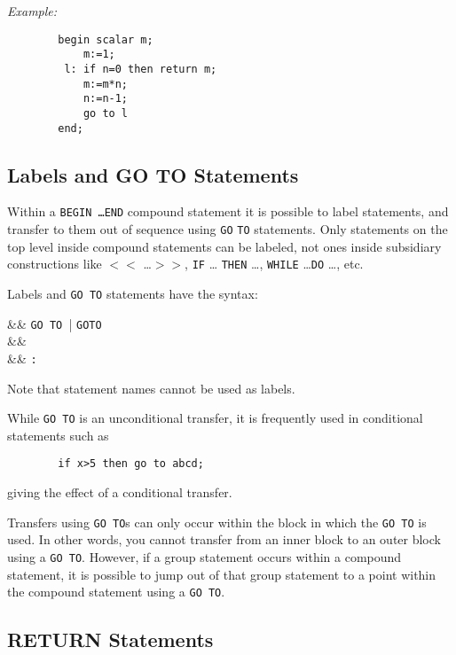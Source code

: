 \textit{Example:}
\begin{verbatim}
        begin scalar m;
            m:=1;
         l: if n=0 then return m;
            m:=m*n;
            n:=n-1;
            go to l
        end;
\end{verbatim}

\subsection{Labels and GO TO Statements}
\hypertarget{command:GOTO}{}

Within a \texttt{BEGIN \ldots END} compound
statement it is possible to label statements, and transfer to them out of
sequence using \texttt{GO} \texttt{TO} statements.  Only statements on the top
level inside compound statements can be labeled, not ones inside
subsidiary constructions like \texttt{$<<$} \ldots \texttt{$>>$}, \texttt{IF} \ldots
\texttt{THEN} \ldots , \texttt{WHILE} \ldots \texttt{DO} \ldots , etc.

Labels and \texttt{GO TO} statements have the syntax:
\begin{syntaxtable}
   &\BNFprod& \texttt{GO TO }|%
                                    \texttt{GOTO } \\
   &\BNFprod& \\
   &\BNFprod& \texttt{:}
\end{syntaxtable}
Note that statement names cannot be used as labels.

While \texttt{GO TO} is an unconditional transfer, it is frequently used
in conditional statements such as
\begin{verbatim}
        if x>5 then go to abcd;
\end{verbatim}
giving the effect of a conditional transfer.

Transfers using \texttt{GO TO}s can only occur within the block in which the
\texttt{GO TO} is used.  In other words, you cannot transfer from an inner
block to an outer block using a \texttt{GO TO}.  However, if a group statement
occurs within a compound statement, it is possible to jump out of that group
statement to a point within the compound statement using a \texttt{GO TO}.

\subsection{RETURN Statements}
\hypertarget{command:RETURN}{}

